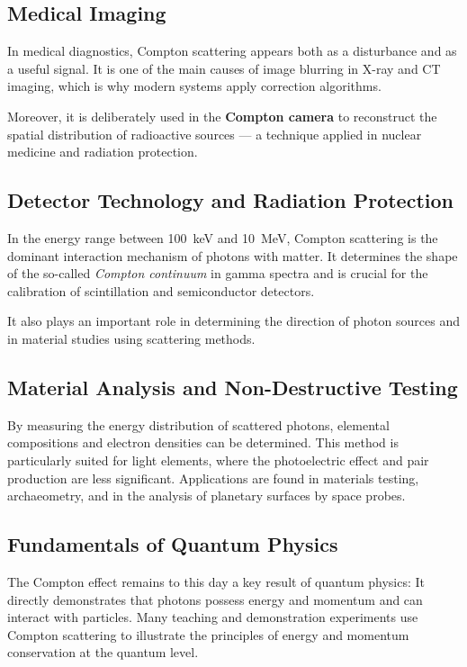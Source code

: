 \subsection{Medical Imaging}
In medical diagnostics, Compton scattering appears both as a
disturbance and as a useful signal.
It is one of the main causes of image blurring in X-ray and CT imaging,
which is why modern systems apply correction algorithms.

Moreover, it is deliberately used in the \textbf{Compton camera}
to reconstruct the spatial distribution of radioactive sources —
a technique applied in nuclear medicine and radiation protection.

\subsection{Detector Technology and Radiation Protection}
In the energy range between \SI{100}{\kilo\electronvolt} and \SI{10}{\mega\electronvolt},
Compton scattering is the dominant interaction mechanism
of photons with matter.
It determines the shape of the so-called \emph{Compton continuum}
in gamma spectra and is crucial for the calibration of scintillation
and semiconductor detectors.

It also plays an important role in determining the direction of photon sources
and in material studies using scattering methods.

\subsection{Material Analysis and Non-Destructive Testing}
By measuring the energy distribution of scattered photons,
elemental compositions and electron densities can be determined.
This method is particularly suited for light elements,
where the photoelectric effect and pair production are less significant.
Applications are found in materials testing, archaeometry,
and in the analysis of planetary surfaces by space probes.

\subsection{Fundamentals of Quantum Physics}
The Compton effect remains to this day a key result of quantum physics:
It directly demonstrates that photons possess energy and momentum
and can interact with particles.
Many teaching and demonstration experiments use Compton scattering
to illustrate the principles of energy and momentum conservation
at the quantum level.

